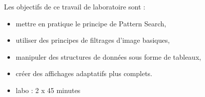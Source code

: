 \noindent Les objectifs de ce travail de laboratoire sont :
\begin{itemize}
  \item mettre en pratique le principe de Pattern Search,
  \item utiliser des principes de filtrages d'image basiques,
  \item manipuler des structures de données sous forme de tableaux,
  \item créer des affichages adaptatifs plus complets.
\end{itemize}
\vspace{0.5cm}

\begin{itemize}
\item labo : 2 x 45 minutes\\
\end{itemize}
